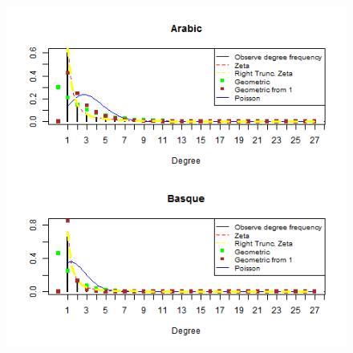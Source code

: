 \documentclass[paper=a4, fontsize=11pt]{scrartcl} %
\theoremstyle{plain}
\begin{document}
\begin{figure}[!htbp] %
   \centering
   \includegraphics[width=15cm,height=27cm]{General_1} %
  
\end{figure}
\end{document}
